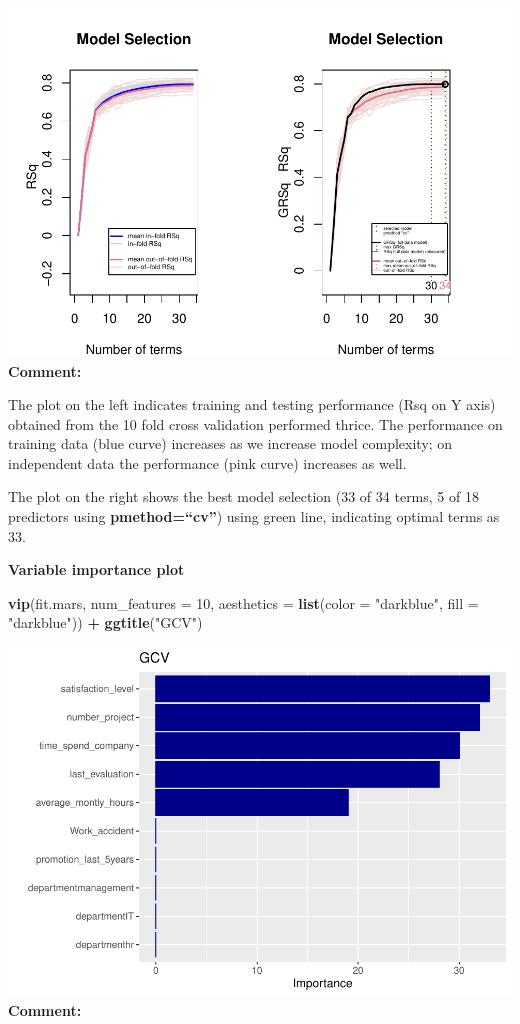 \documentclass[
  11pt,
]{article}
\newenvironment{Shaded}{\begin{snugshade}}{\end{snugshade}}
\newcommand{\AttributeTok}[1]{\textcolor[rgb]{0.13,0.29,0.53}{#1}}
\newcommand{\DecValTok}[1]{\textcolor[rgb]{0.00,0.00,0.81}{#1}}
\newcommand{\FunctionTok}[1]{\textcolor[rgb]{0.13,0.29,0.53}{\textbf{#1}}}
\newcommand{\NormalTok}[1]{#1}
\newcommand{\SpecialCharTok}[1]{\textcolor[rgb]{0.81,0.36,0.00}{\textbf{#1}}}
\newcommand{\StringTok}[1]{\textcolor[rgb]{0.31,0.60,0.02}{#1}}
\begin{document}
\includegraphics[width=0.9\linewidth]{OWUSU_project_files/figure-latex/unnamed-chunk-40-1}\\
\textbf{Comment:}

The plot on the left indicates training and testing performance (Rsq on
Y axis) obtained from the 10 fold cross validation performed thrice. The
performance on training data (blue curve) increases as we increase model
complexity; on independent data the performance (pink curve) increases
as well.

The plot on the right shows the best model selection (33 of 34 terms, 5
of 18 predictors using \textbf{pmethod=``cv''}) using green line,
indicating optimal terms as 33.

\hfill\break

\textbf{Variable importance plot}

\begin{Shaded}
\begin{Highlighting}[]
\FunctionTok{vip}\NormalTok{(fit.mars, }\AttributeTok{num\_features =} \DecValTok{10}\NormalTok{, }\AttributeTok{aesthetics =} \FunctionTok{list}\NormalTok{(}\AttributeTok{color =} \StringTok{"darkblue"}\NormalTok{, }\AttributeTok{fill =} \StringTok{"darkblue"}\NormalTok{)) }\SpecialCharTok{+} \FunctionTok{ggtitle}\NormalTok{(}\StringTok{"GCV"}\NormalTok{)}
\end{Highlighting}
\end{Shaded}

\includegraphics[width=0.9\linewidth]{OWUSU_project_files/figure-latex/unnamed-chunk-41-1}\\
\textbf{Comment:}
\end{document}
